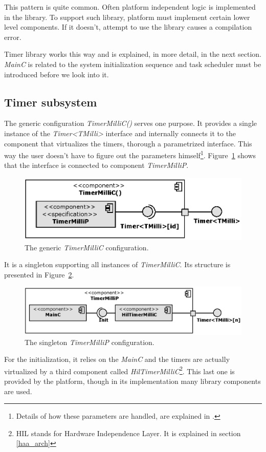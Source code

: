 This pattern is quite common. Often platform independent logic is
implemented in the library. To support such library, platform must
implement certain lower level components.  If it doesn't, attempt to
use the library causes a compilation error.

Timer library works this way and is explained, in more detail, in the
next section. \emph{MainC} is related to the system initialization
sequence and task scheduler must be introduced before we look into
it.

\subsection{Timer subsystem}

The generic configuration \emph{TimerMilliC()} serves one purpose. It
provides a single instance of the \emph{Timer<TMilli>} interface and
internally connects it to the component that virtualizes the timers,
thorough a parametrized interface. This way the user doesn't have to
figure out the parameters himself\footnote{Details of how these
parameters are handled, are explained in \cite[ch. 6]{TOSProg}.}.
Figure~\ref{fig:timermillic} shows that the interface is connected to
component \emph{TimerMilliP}.
\begin{figure}[h]
  \centering
  \includegraphics{diagrams/timermillic.eps}
  \caption{The generic \emph{TimerMilliC} configuration.}
  \label{fig:timermillic}
\end{figure}
It is a singleton supporting all instances of \emph{TimerMilliC}. Its
structure is presented in Figure~\ref{fig:timermillip}.
\begin{figure}[h]
  \centering
  \includegraphics{diagrams/timermillip.eps}
  \caption{The singleton \emph{TimerMilliP} configuration.}
  \label{fig:timermillip}
\end{figure}
For the initialization, it relies on the \emph{MainC}
and the timers are actually virtualized by a third component called
\emph{HilTimerMilliC}\footnote{HIL stands for Hardware Independence
Layer. It is explained in section \ref{haa_arch}}. This last one is
provided by the platform, though in its implementation many library
components are used.

